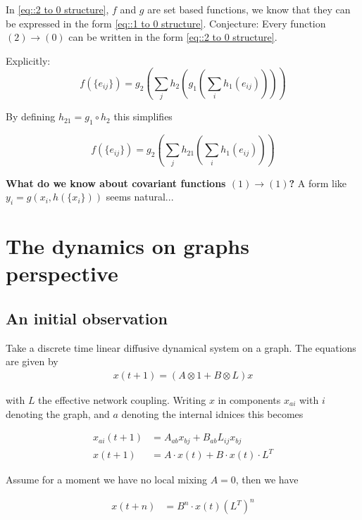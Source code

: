 \documentclass[reprint,twocolumn,amsmath,amssymb,aps]{revtex4-1}
\begin{document}
In \eqref{eq::2 to 0 structure}, $f$ and $g$ are set based functions, we know that they can be expressed in the form \eqref{eq::1 to 0 structure}. Conjecture: Every function $(2) \rightarrow (0)$ can be written in the form \eqref{eq::2 to 0 structure}.

Explicitly:
\begin{equation}
f(\{e_{ij}\}) = g_2\left(\sum_j h_2 \left(g_1 \left( \sum_i h_1(e_{ij})\right)\right)\right)
\end{equation}

By defining $h_{21} = g_1 \circ h_2$ this simplifies

\begin{equation} \label{eq::2 to 0 structure conjecture}
f(\{e_{ij}\}) = g_2\left(\sum_j h_{21} \left( \sum_i h_1(e_{ij})\right)\right)
\end{equation}

\textbf{What do we know about covariant functions $(1) \rightarrow (1)$?} A form like $y_i = g(x_i, h(\{x_i\}))$ seems natural...

\section{The dynamics on graphs perspective}

\subsection{An initial observation}

Take a discrete time linear diffusive dynamical system on a graph. The equations are given by
\begin{align}
x(t + 1) = \left( A \otimes 1 + B \otimes L \right) x
\end{align}

with $L$ the effective network coupling.
Writing $x$ in components $x_{ai}$ with $i$ denoting the graph, and $a$ denoting the internal idnices this becomes

\begin{align}
x_{ai}(t + 1) &= A_{ab} x_{bj} + B_{ab} L_{ij} x_{bj} \\
x(t+1) &= A \cdot x(t) + B \cdot x(t) \cdot L^T
\end{align}

Assume for a moment we have no local mixing $A = 0$, then we have

\begin{align}
x(t+n) &= B^n \cdot x(t) (L^T)^n
\end{align}
\end{document}
